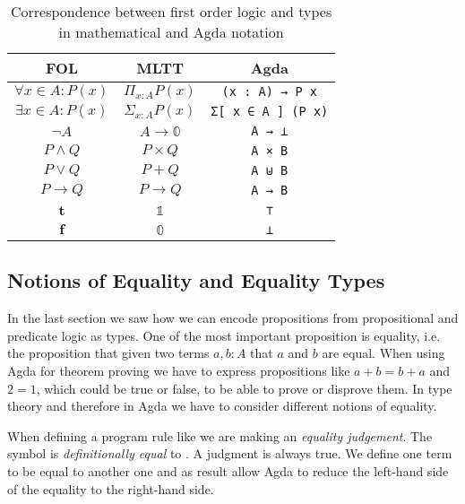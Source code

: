 \begin{table}
  \begin{center}
    \begin{tabular}{ccc}
      FOL & MLTT & Agda \\\hline
      $\forall x \in A: P(x)$ & $\Pi_{x:A}P(x)$ & \texttt{(x : A) → P x} \\
      $\exists x \in A: P(x)$ & $\Sigma_{x:A} P(x)$ & \texttt{Σ[ x ∈ A ] (P x)} \\
      $\neg A$ & $A \rightarrow \mathbb 0$ & \texttt{A → ⊥} \\
      $P \wedge Q$ & $P \times Q$ & \texttt{A × B} \\
      $P \vee Q$ & $P + Q$ & \texttt{A ⊎ B} \\
      $P \rightarrow Q$ & $P \rightarrow Q$ & \texttt{A → B} \\
      $\mathbf t$ & $\mathbb 1$ & \texttt{⊤} \\
      $\mathbf f$ & $\mathbb 0$ & \texttt{⊥}
    \end{tabular}
  \end{center}
  \label{preliminaries:propositions-as-types:table}
  \caption{Correspondence between first order logic and types in mathematical
    and Agda notation}
\end{table}

\subsection{Notions of Equality and Equality Types}

In the last section we saw how we can encode propositions from propositional and
predicate logic as types.
One of the most important proposition is equality, i.e. the proposition that
given two terms $a, b : A$ that $a$ and $b$ are equal.
When using Agda for theorem proving we have to express propositions like $a + b
= b + a$ and $2 = 1$, which could be true or false, to be able to prove or
disprove them.
In type theory and therefore in Agda we have to consider different notions of
equality.

When defining a program rule like
\AgdaSpace{}\AgdaSymbol{=}\AgdaSpace{}
we are making an \textit{equality judgement}.
The symbol  is \textit{definitionally equal} to
.
A judgment is always true.
We define one term to be equal to another one and as result allow Agda to reduce
the left-hand side of the equality to the right-hand side.

